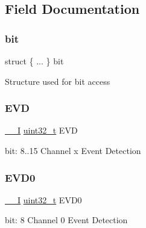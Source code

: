 \subsection{Field Documentation}
\mbox{\label{union_e_v_s_y_s___i_n_t_f_l_a_g___type_ada21d99e19c1ab244f7a4ac1e2225abf}} 
\subsubsection{\texorpdfstring{bit}{bit}}
{\footnotesize\ttfamily struct \{ ... \}   bit}

Structure used for bit access \mbox{\label{union_e_v_s_y_s___i_n_t_f_l_a_g___type_adabcaa37d0c33c193a74a3ba49df7cd9}} 
\subsubsection{\texorpdfstring{EVD}{EVD}}
{\footnotesize\ttfamily \mbox{\hyperlink{core__cm0plus_8h_af63697ed9952cc71e1225efe205f6cd3}{\+\_\+\+\_\+I}} \mbox{\hyperlink{union_e_v_s_y_s___i_n_t_f_l_a_g___type_a7c2ec0f7b3f1314bdede58b182af397c}{uint32\+\_\+t}} E\+VD}

bit\+: 8..15 Channel x Event Detection \mbox{\label{union_e_v_s_y_s___i_n_t_f_l_a_g___type_ad6d44ca4b1c805738dfe899ad871fb32}} 
\subsubsection{\texorpdfstring{EVD0}{EVD0}}
{\footnotesize\ttfamily \mbox{\hyperlink{core__cm0plus_8h_af63697ed9952cc71e1225efe205f6cd3}{\+\_\+\+\_\+I}} \mbox{\hyperlink{union_e_v_s_y_s___i_n_t_f_l_a_g___type_a7c2ec0f7b3f1314bdede58b182af397c}{uint32\+\_\+t}} E\+V\+D0}

bit\+: 8 Channel 0 Event Detection \mbox{\label{union_e_v_s_y_s___i_n_t_f_l_a_g___type_a7465bf89d82eeafa6c2d958e5da8d54e}} 
